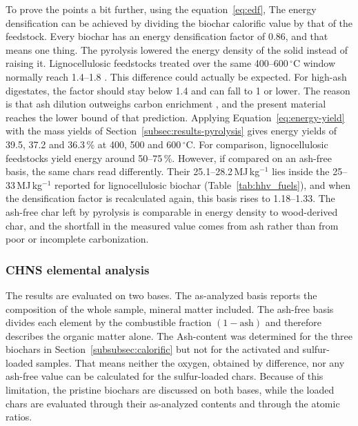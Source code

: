 To prove the points a bit further, using the equation~\ref{eq:edf}, The energy densification can be achieved by dividing the biochar calorific value by that of the feedstock. Every biochar has an energy densification factor of 0.86, and that means one thing. The pyrolysis lowered the energy density of the solid instead of raising it. Lignocellulosic feedstocks treated over the same 400--600\,$^{\circ}$C window normally reach 1.4--1.8 \parencite{bridgwater-2011, antal-2003}. This difference could actually be expected. For high-ash digestates, the factor should stay below 1.4 and can fall to 1 or lower. The reason is that ash dilution outweighs carbon enrichment \parencite{hung-2017, opatokun-2015}, and the present material reaches the lower bound of that prediction. Applying Equation~\ref{eq:energy-yield} with the mass
yields of Section~\ref{subsec:results-pyrolysis} gives energy yields of 39.5,
37.2 and 36.3\,\% at 400, 500 and 600\,$^{\circ}$C. For comparison, lignocellulosic feedstocks yield energy around 50--75\,\%.
However, if compared on an ash-free basis, the same chars read differently. Their 25.1--28.2\,MJ\,kg$^{-1}$ lies inside the 25--33\,MJ\,kg$^{-1}$ reported for lignocellulosic
biochar (Table~\ref{tab:hhv_fuels}), and when the densification factor is recalculated again, this basis rises to 1.18--1.33. The ash-free char left by pyrolysis is comparable in energy density to wood-derived char, and the shortfall in the measured value comes from ash rather than from poor or incomplete carbonization. 




\newpage
\subsubsection{CHNS elemental analysis}
\label{subsubsec:chns}

The results are evaluated on two bases. The as-analyzed basis reports the composition of the whole sample, mineral matter included. The ash-free basis divides each element by the combustible fraction $(1-\text{ash})$ and therefore describes the organic matter alone. The Ash-content was determined for the three biochars in Section~\ref{subsubsec:calorific} but not for the activated and sulfur-loaded samples. That means neither the oxygen, obtained by difference, nor any ash-free value can be calculated for the sulfur-loaded chars. Because of this limitation, the pristine biochars are discussed on both bases, while the loaded chars are evaluated through their as-analyzed contents and through the atomic ratios.


